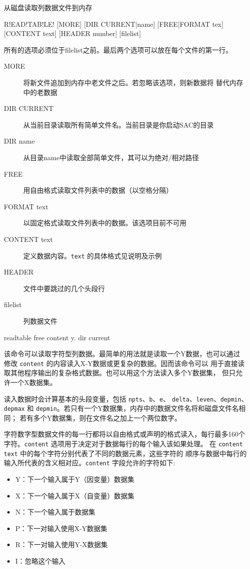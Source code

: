 \label{cmd:readtable}

从磁盘读取列数据文件到内存

\begin{SACSTX}
R!EAD!TAB!LE! [MORE] [DIR CURRENT|name] [FREE|FORMAT tex] [CONTENT text]
    [HEADER number] [filelist]
\end{SACSTX}
所有的选项必须位于filelist之前。最后两个选项可以放在每个文件的第一行。

\begin{description}
\item [MORE] 将新文件追加到内存中老文件之后。若忽略该选项，则新数据将
    替代内存中的老数据
\item [DIR CURRENT] 从当前目录读取所有简单文件名。当前目录是你启动SAC的目录
\item [DIR name] 从目录name中读取全部简单文件，其可以为绝对/相对路径
\item [FREE] 用自由格式读取文件列表中的数据（以空格分隔）
\item [FORMAT text] 以固定格式读取文件列表中的数据。该选项目前不可用
\item [CONTENT text] 定义数据内容。\texttt{text} 的具体格式见说明及示例
\item [HEADER] 文件中要跳过的几个头段行
\item [filelist] 列数据文件
\end{description}

\begin{SACDFT}
readtable free content y. dir current
\end{SACDFT}

该命令可以读取字符型列数据。最简单的用法就是读取一个Y数据，也可以通过
修改 \texttt{content} 的内容读入X-Y数据或更复杂的数据。因而该命令可以
用于直接读取其他程序输出的复杂格式数据。也可以用这个方法读入多个Y数据集，
但只允许一个X数据集。

读入数据时会计算基本的头段变量，包括 \texttt{npts}、\texttt{b}、\texttt{e}、
\texttt{delta}、\texttt{leven}、\texttt{depmin}、\texttt{depmax} 和
\texttt{depmin}。若只有一个Y数据集，内存中的数据文件名将和磁盘文件名相同；
若有多个Y数据集，则在文件名之加上一个两位数字。

字符数字型数据文件的每一行都将以自由格式或声明的格式读入，每行最多160个
字符。\texttt{content} 选项用于决定对于数据每行的每个输入该如果处理。
在 \texttt{content text} 中的每个字符分别代表了不同的数据元素，这些字符的
顺序与数据中每行的输入所代表的含义相对应。\texttt{content} 字段允许的字符如下:
\begin{itemize}
\item Y：下一个输入属于Y（因变量）数据集
\item X：下一个输入属于X（自变量）数据集
\item N：下一个输入属于数据集
\item P：下一对输入使用X-Y数据集
\item R：下一对输入使用Y-X数据集
\item I：忽略这个输入
\end{itemize}

